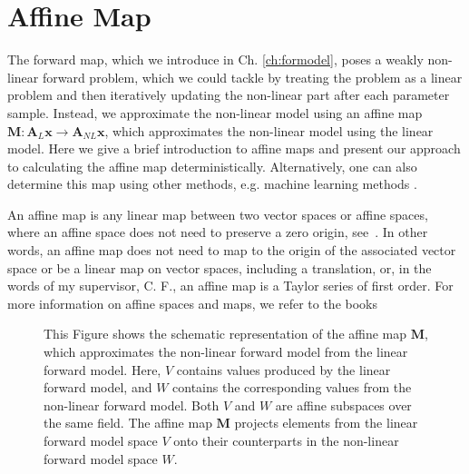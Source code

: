 \section{Affine Map}
\label{sec:affine}
The forward map, which we introduce in Ch. \ref{ch:formodel}, poses a weakly non-linear forward problem, which we could tackle by treating the problem as a linear problem and then iteratively updating the non-linear part after each parameter sample.
Instead, we approximate the non-linear model using an affine map $ \bm{M}:\bm{A}_L \bm{x} \rightarrow \bm{A}_{NL}\bm{x}$, which approximates the non-linear model using the linear model.
Here we give a brief introduction to affine maps and present our approach to calculating the affine map deterministically. 
Alternatively, one can also determine this map using other methods, e.g. machine learning methods \cite{}.


An affine map is any linear map between two vector spaces or affine spaces, where an affine space does not need to preserve a zero origin, see~\cite[Def. 2.3.1]{berger2009geometry}.
In other words, an affine map does not need to map to the origin of the associated vector space or be a linear map on vector spaces, including a translation, or, in the words of my supervisor, C. F., an affine map is a Taylor series of first order.
For more information on affine spaces and maps, we refer to the books \cite{berger2009geometry, katsumi1994affine}
\begin{figure}[ht!]
	\centering
	\caption[Schematics of the affine map]{This Figure shows the schematic representation of the affine map $\bm{M}$, which approximates the non-linear forward model from the linear forward model. Here, $V$ contains values produced by the linear forward model, and $W$ contains the corresponding values from the non-linear forward model. Both $V$ and $W$ are affine subspaces over the same field. The affine map $\bm{M}$ projects elements from the linear forward model space $V$ onto their counterparts in the non-linear forward model space $W$.
	}
\end{figure}



